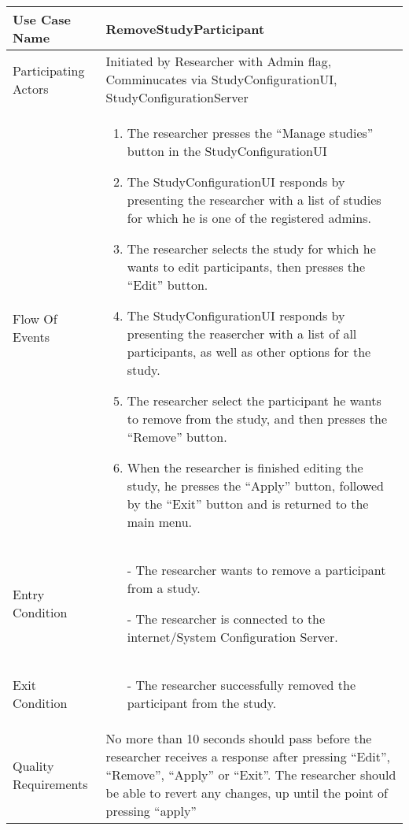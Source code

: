 \begin{center}
	\begin{tabular}{ | l | p{10cm} |} \hline
	    Use Case Name & \textbf{RemoveStudyParticipant}\\ \hline
	    Participating Actors &  Initiated by Researcher with Admin flag, Comminucates via StudyConfigurationUI, StudyConfigurationServer\\ \hline
	    Flow Of Events &
	    \begin{enumerate}
		    \item The researcher presses the “Manage studies” button in the StudyConfigurationUI
		    \item The StudyConfigurationUI responds by presenting the researcher with a list of studies for which he is one of the registered admins.
		    \item The researcher selects the study for which he wants to edit participants, then presses the “Edit” button.
		    \item The StudyConfigurationUI responds by presenting the reasercher with a list of all participants, as well as other options for the study.
		    \item The researcher select the participant he wants to remove from the study, and then presses the “Remove” button.
		    \item When the researcher is finished editing the study, he presses the “Apply” button, followed by the “Exit” button and is returned to the main menu.	    
	    \end{enumerate}\\ \hline
	    Entry Condition & 
	    \begin{enumerate}
		    \item[-] The researcher wants to remove a participant from a study.
		    \item[-] The researcher is connected to the internet/System Configuration Server.
	    \end{enumerate}
	    \\ \hline
	    Exit Condition &
	   	\begin{enumerate}
	   		\item[-] The researcher successfully removed the participant from the study.
	   	\end{enumerate}
	   	\\ \hline
	    Quality Requirements & No more than 10 seconds should pass before the researcher receives a response after pressing “Edit”, “Remove”, “Apply”  or “Exit”.\newline
	    The researcher should be able to revert any changes, up until the point of pressing “apply”\\ \hline
	\end{tabular}
\end{center}

